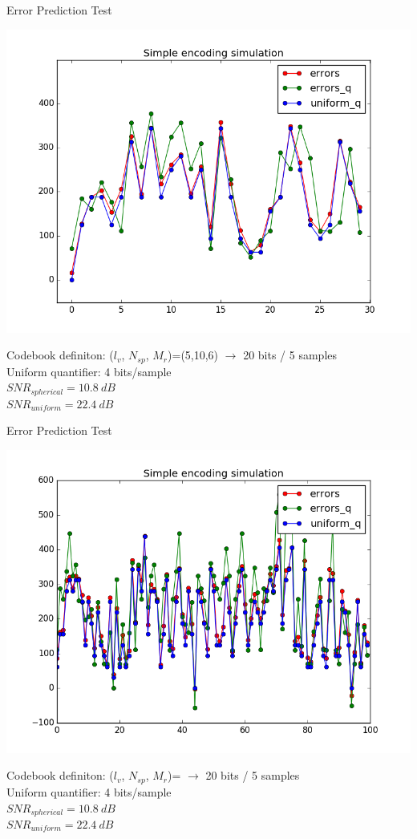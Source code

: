 \documentclass[10pt]{beamer}
\begin{document}
  \begin{frame}{Error Prediction Test}
    \begin{center}
    \includegraphics[width=0.75\linewidth]{./img/Bona_comparativa.png}\\
    \end{center}
    Codebook definiton: ($l_v$, $N_{sp}$, $M_r$)=(5,10,6) $\rightarrow$ 20 bits / 5 samples\\
    Uniform quantifier: 4 bits/sample\\
    $SNR_{spherical} = 10.8\ dB$\\
    $SNR_{uniform} = 22.4\ dB$\\
  \end{frame}

  \begin{frame}{Error Prediction Test}
    \begin{center}
    \includegraphics[width=0.75\linewidth]{./img/Bona_comparativa_moltes_mostres.png}\\
    \end{center}
    Codebook definiton: ($l_v$, $N_{sp}$, $M_r$)= $\rightarrow$ 20 bits / 5 samples\\
    Uniform quantifier: 4 bits/sample\\
    $SNR_{spherical} = 10.8\ dB$\\
    $SNR_{uniform} = 22.4\ dB$\\
  \end{frame}
\end{document}
